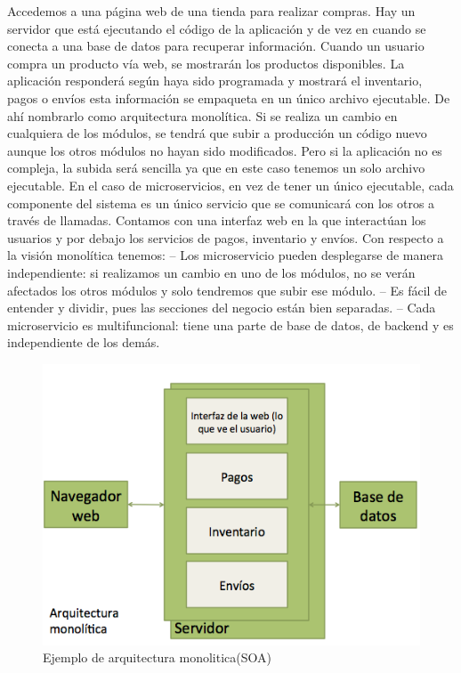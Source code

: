 \documentclass[12pt]{report} %
\begin{document}
Accedemos a una página web de una tienda para realizar compras. Hay un servidor que está ejecutando el código de la aplicación y de vez en cuando se conecta a una base de datos para recuperar información.
Cuando un usuario compra un producto vía web, se mostrarán los productos disponibles. La aplicación responderá según haya sido programada y mostrará el inventario, pagos o envíos esta información se empaqueta en un único archivo ejecutable. De ahí nombrarlo como arquitectura monolítica.
Si se realiza un cambio en cualquiera de los módulos, se tendrá que subir a producción un código nuevo aunque los otros módulos no hayan sido modificados. 
Pero si la aplicación no es compleja, la subida será sencilla ya que en este caso tenemos un solo archivo ejecutable.
En el caso de microservicios, en vez de tener un único ejecutable, cada componente del sistema es un único servicio que se comunicará con los otros a través de llamadas.
Contamos con una interfaz web en la que interactúan los usuarios y por debajo los servicios de pagos, inventario y envíos.
Con respecto a la visión monolítica tenemos:
– Los microservicio pueden desplegarse de manera independiente: si realizamos un cambio en uno de los módulos, no se verán afectados los otros módulos y solo tendremos que subir ese módulo.
– Es fácil de entender y dividir, pues las secciones del negocio están bien separadas.
– Cada microservicio es multifuncional: tiene una parte de base de datos, de backend y es independiente de los demás. 
\begin{figure}
	\centering
	\includegraphics[width=0.7\linewidth]{imagenes/monolithic}
	\caption{Ejemplo de arquitectura monolitica(SOA)}
	\label{fig:monolithic}
\end{figure}
\end{document}
